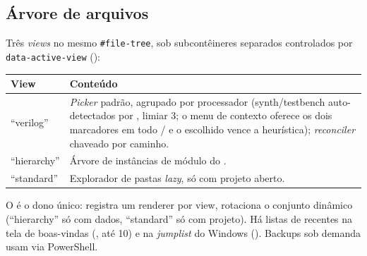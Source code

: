 \subsection{Árvore de arquivos}
Três \emph{views} no mesmo \lstinline|#file-tree|, sob subcontêineres separados
controlados por \lstinline|data-active-view| ():

\begin{tabularx}{\linewidth}{l Y}
\toprule
\textbf{View} & \textbf{Conteúdo} \\
\midrule
\enquote{verilog} & \emph{Picker} padrão, agrupado por processador (synth/testbench auto-detectados por , limiar 3; o menu de contexto oferece os dois marcadores em todo / e o escolhido vence a heurística); \emph{reconciler} chaveado por caminho. \\
\enquote{hierarchy} & Árvore de instâncias de módulo do . \\
\enquote{standard} & Explorador de pastas \emph{lazy}, só com projeto aberto. \\
\bottomrule
\end{tabularx}

O  é o dono único: registra um renderer por
view, rotaciona o conjunto dinâmico (\enquote{hierarchy} só com dados,
\enquote{standard} só com projeto). Há listas de recentes na tela de boas-vindas
(, até 10) e na \emph{jumplist} do Windows
(). Backups  sob demanda usam
 via PowerShell.
